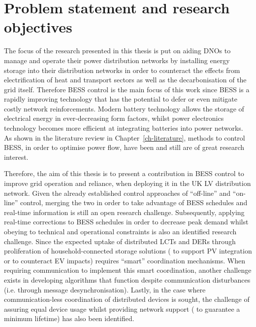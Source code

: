 \section{Problem statement and research objectives}
\label{ch-introduction:sec:problem-statement}

The focus of the research presented in this thesis is put on aiding DNOs to manage and operate their power distribution networks by installing energy storage into their distribution networks in order to counteract the effects from electrification of heat and transport sectors as well as the decarbonisation of the grid itself.
Therefore BESS control is the main focus of this work since BESS is a rapidly improving technology that has the potential to defer or even mitigate costly network reinforcements.
Modern battery technology allows the storage of electrical energy in ever-decreasing form factors, whilst power electronics technology becomes more efficient at integrating batteries into power networks.
As shown in the literature review in Chapter~\ref{ch-literature}, methods to control BESS,  in order to optimise power flow, have been and still are of great research interest.

Therefore, the aim of this thesis is to present a contribution in BESS control to improve grid operation and reliance, when deploying it in the UK LV distribution network.
Given the already established control approaches of ``off-line'' and ``on-line'' control, merging the two in order to take advantage of BESS schedules and real-time information is still an open research challenge.
Subsequently, applying real-time corrections to BESS schedules in order to decrease peak demand whilst obeying to technical and operational constraints is also an identified research challenge.
Since the expected uptake of distributed LCTs and DERs through proliferation of household-connected storage solutions ( to support PV integration or to counteract EV impacts) requires ``smart'' coordination mechanisms.
When requiring communication to implement this smart coordination, another challenge exists in developing algorithms that function despite communication disturbances (i.e. through message desynchronisation).
Lastly, in the case where communication-less coordination of distributed devices is sought, the challenge of assuring equal device usage whilst providing network support ( to guarantee a minimum lifetime) has also been identified.

